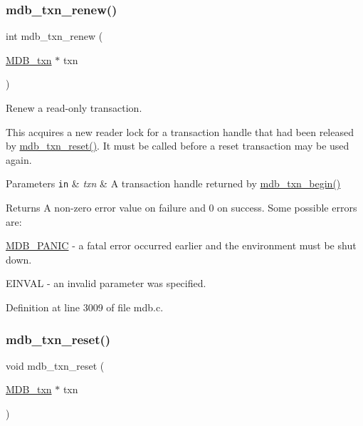 \subsubsection{\texorpdfstring{mdb\+\_\+txn\+\_\+renew()}{mdb\_txn\_renew()}}
{\footnotesize\ttfamily int mdb\+\_\+txn\+\_\+renew (\begin{DoxyParamCaption}\item[{\mbox{\hyperlink{struct_m_d_b__txn}{M\+D\+B\+\_\+txn}} $\ast$}]{txn }\end{DoxyParamCaption})}



Renew a read-\/only transaction. 

This acquires a new reader lock for a transaction handle that had been released by \mbox{\hyperlink{group__mdb_ga02b06706f8a66249769503c4e88c56cd}{mdb\+\_\+txn\+\_\+reset()}}. It must be called before a reset transaction may be used again. 
\begin{DoxyParams}[1]{Parameters}
\mbox{\tt in}  & {\em txn} & A transaction handle returned by \mbox{\hyperlink{group__mdb_gad7ea55da06b77513609efebd44b26920}{mdb\+\_\+txn\+\_\+begin()}} \\
\hline
\end{DoxyParams}
\begin{DoxyReturn}{Returns}
A non-\/zero error value on failure and 0 on success. Some possible errors are\+: 
\begin{DoxyItemize}
\item \mbox{\hyperlink{group__errors_gae37b9aedcb3767faba3de8c1cf6d3473}{M\+D\+B\+\_\+\+P\+A\+N\+IC}} -\/ a fatal error occurred earlier and the environment must be shut down. 
\item E\+I\+N\+V\+AL -\/ an invalid parameter was specified. 
\end{DoxyItemize}
\end{DoxyReturn}


Definition at line 3009 of file mdb.\+c.

\mbox{\label{group__mdb_ga02b06706f8a66249769503c4e88c56cd}} 
\subsubsection{\texorpdfstring{mdb\+\_\+txn\+\_\+reset()}{mdb\_txn\_reset()}}
{\footnotesize\ttfamily void mdb\+\_\+txn\+\_\+reset (\begin{DoxyParamCaption}\item[{\mbox{\hyperlink{struct_m_d_b__txn}{M\+D\+B\+\_\+txn}} $\ast$}]{txn }\end{DoxyParamCaption})}



